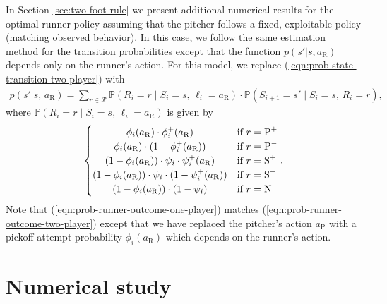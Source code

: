 \documentclass[11pt]{article}
\begin{document}
      In Section \ref{sec:two-foot-rule} we present additional numerical results for the optimal runner policy assuming that the pitcher follows a fixed, exploitable policy (matching observed behavior). In this case, we follow the same estimation method for the transition probabilities except that the function $p(s'|s,a_\text{R})$ depends only on the runner's action. For this model, we replace (\ref{eqn:prob-state-transition-two-player}) with
      \begin{align}
        \label{eqn:prob-state-transition-one-player}
        p(s'|s,\, a_\text{R}) = \sum_{r \in \mathcal{R}} \mathbb{P}(R_i = r \mid S_i = s,\, \ell_i = a_\text{R}) \cdot \mathbb{P}(S_{i+1} = s' \mid S_i = s,\, R_i = r),
      \end{align}
      where $\mathbb{P}(R_i = r \mid S_i = s,\, \ell_i = a_\text{R})$ is given by
      \begin{align}
        \label{eqn:prob-runner-outcome-one-player}
        \begin{split}
          \begin{cases}
              \hfil \phi_i(a_\text{R}) \cdot \phi_i^+(a_\text{R})                             & \mbox{if } r = \mbox{P}^+\\
              \hfil \phi_i(a_\text{R}) \cdot (1 - \phi_i^+(a_\text{R}))                       & \mbox{if } r = \mbox{P}^-\\
              \hfil (1 - \phi_i(a_\text{R})) \cdot \psi_i \cdot \psi_i^+(a_\text{R})         & \mbox{if } r = \mbox{S}^+\\
              \hfil (1 - \phi_i(a_\text{R})) \cdot \psi_i \cdot (1 - \psi_i^+(a_\text{R}))   & \mbox{if } r = \mbox{S}^-\\
              \hfil (1 - \phi_i(a_\text{R})) \cdot (1 - \psi_i)                              & \mbox{if } r = \mbox{N}\\
          \end{cases}.
        \end{split}
      \end{align}
      Note that (\ref{eqn:prob-runner-outcome-one-player}) matches (\ref{eqn:prob-runner-outcome-two-player}) except that we have replaced the pitcher's action $a_\text{P}$ with a pickoff attempt probability $\phi_i(a_\text{R})$ which depends on the runner's action.
      
  \section{Numerical study}
  \label{sec:results}
\end{document}
